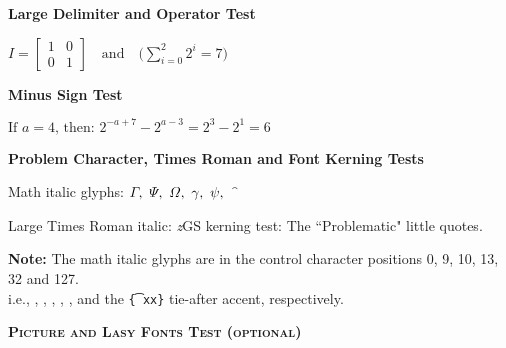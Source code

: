\documentclass[\papertype, 10pt]{article}
\newlength{\help}
\newcounter{help}
\newcounter{in}
\newcounter{mm}
\newcounter{foo}
\newcounter{x}
\newcounter{y}
\begin{document}
\begin{minipage}{\help}
\centerline{\normalsize\bfseries Large Delimiter and Operator Test}
\begin{center}
\begin{math}
I = \left[ 
    \begin{array}{cc}
    1 & 0\\
    0 & 1
   \end{array}
   \right]\quad \mbox{and}   
\quad\Bigg(\sum\limits_{i=0}^{2} 2^i = 7 \Bigg)
\end{math}
\end{center}

\vspace{0.25\baselineskip}

\centerline{\normalsize\bfseries Minus Sign Test}
\begin{center}
\begin{math}
\mbox{If } a = 4\mbox{, then: } 2^{-a + 7} - 2^{a-3} = 2^{3} - 2^{1} = 6
\end{math}
\end{center}

\vspace{0.1\baselineskip}
\centerline{\normalsize\bfseries Problem Character, Times Roman and Font Kerning Tests}
\vspace{0.5\baselineskip}
\centerline{\normalfont Math italic glyphs: $\mathnormal{\Gamma,~\Psi,~\Omega,~\gamma,~\psi,~\mbox{\t{\mbox{}\mbox{}}}}$}
\vspace{0.25\baselineskip}
\centerline{Large Times Roman italic: {\LARGE \textit{z}}\qquad GS kerning test: {\footnotesize The ``Problematic" little quotes.}} 

\vspace{0.25\baselineskip}
{\footnotesize\textbf{Note:} The math italic glyphs are in the control character positions 
0, 9, 10, 13, 32 and 127.\hfill\\
i.e., \texttt{\string\Gamma}, \texttt{\string\Psi}, \texttt{\string\Omega}, 
\texttt{\string\gamma}, \texttt{\string\psi}, and the \texttt{\string\t\{xx\}} tie-after accent, respectively.} 


\vspace{1.5\baselineskip}
\centerline{\large\bfseries\scshape Picture and Lasy Fonts Test {\normalfont(optional)}}
\vspace{0.5\baselineskip}


\end{minipage}
\end{document}
